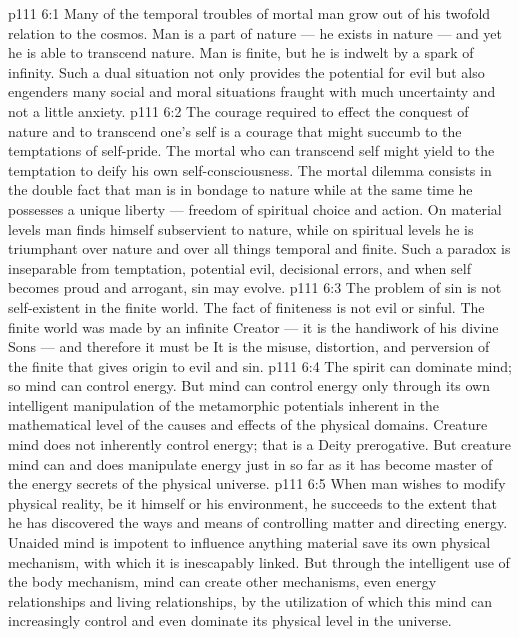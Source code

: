 \vs p111 6:1 Many of the temporal troubles of mortal man grow out of his twofold relation to the cosmos. Man is a part of nature --- he exists in nature --- and yet he is able to transcend nature. Man is finite, but he is indwelt by a spark of infinity. Such a dual situation not only provides the potential for evil but also engenders many social and moral situations fraught with much uncertainty and not a little anxiety.
\vs p111 6:2 The courage required to effect the conquest of nature and to transcend one’s self is a courage that might succumb to the temptations of self\hyp{}pride. The mortal who can transcend self might yield to the temptation to deify his own self\hyp{}consciousness. The mortal dilemma consists in the double fact that man is in bondage to nature while at the same time he possesses a unique liberty --- freedom of spiritual choice and action. On material levels man finds himself subservient to nature, while on spiritual levels he is triumphant over nature and over all things temporal and finite. Such a paradox is inseparable from temptation, potential evil, decisional errors, and when self becomes proud and arrogant, sin may evolve.
\vs p111 6:3 \pc The problem of sin is not self\hyp{}existent in the finite world. The fact of finiteness is not evil or sinful. The finite world was made by an infinite Creator --- it is the handiwork of his divine Sons --- and therefore it must be  It is the misuse, distortion, and perversion of the finite that gives origin to evil and sin.
\vs p111 6:4 \pc The spirit can dominate mind; so mind can control energy. But mind can control energy only through its own intelligent manipulation of the metamorphic potentials inherent in the mathematical level of the causes and effects of the physical domains. Creature mind does not inherently control energy; that is a Deity prerogative. But creature mind can and does manipulate energy just in so far as it has become master of the energy secrets of the physical universe.
\vs p111 6:5 When man wishes to modify physical reality, be it himself or his environment, he succeeds to the extent that he has discovered the ways and means of controlling matter and directing energy. Unaided mind is impotent to influence anything material save its own physical mechanism, with which it is inescapably linked. But through the intelligent use of the body mechanism, mind can create other mechanisms, even energy relationships and living relationships, by the utilization of which this mind can increasingly control and even dominate its physical level in the universe.
